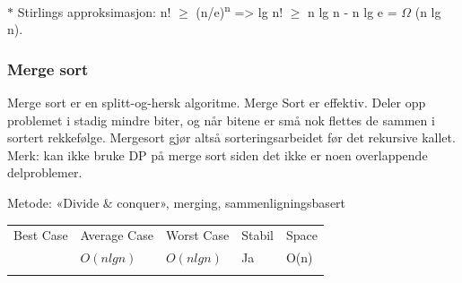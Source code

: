 \documentclass[12pt]{report}
\begin{document}
$\ast$ Stirlings approksimasjon: n! $ \geq $  (n/e)\textsuperscript{n} => lg n! $ \geq $  n lg n - n lg e = $ \Omega $ (n lg n).\par


\vspace{\baselineskip}

\vspace{\baselineskip}

\vspace{\baselineskip}

\vspace{\baselineskip}
\setlength{\parskip}{6.0pt}

\vspace{\baselineskip}\subsubsection*{Merge sort}
\setlength{\parskip}{10.56pt}
Merge sort er en splitt-og-hersk algoritme. Merge Sort er effektiv. Deler opp problemet i stadig mindre biter, og når bitene er små nok flettes de sammen i sortert rekkefølge. Mergesort gjør altså sorteringsarbeidet før det rekursive kallet. Merk: kan ikke bruke DP på merge sort siden det ikke er noen overlappende delproblemer.\par

Metode: «Divide $\&$  conquer», merging, sammenligningsbasert\par





\begin{table}[H]
 			\centering
\begin{tabular}{p{1.2in}p{1.68in}p{1.42in}p{0.73in}p{0.63in}}
\hline
\multicolumn{1}{p{1.2in}}{{\fontsize{13pt}{15.6pt}\selectfont Best Case}} & 
\multicolumn{1}{p{1.68in}}{{\fontsize{13pt}{15.6pt}\selectfont Average Case}} & 
\multicolumn{1}{p{1.42in}}{{\fontsize{13pt}{15.6pt}\selectfont Worst Case}} & 
\multicolumn{1}{p{0.73in}}{{\fontsize{13pt}{15.6pt}\selectfont Stabil}} & 
\multicolumn{1}{p{0.63in}}{{\fontsize{13pt}{15.6pt}\selectfont Space}} \\
\hhline{-----}
\multicolumn{1}{p{1.2in}}{ \( O \left( n lgn \right)  \) } & 
\multicolumn{1}{p{1.68in}}{ \( O \left( n lgn \right)  \) } & 
\multicolumn{1}{p{1.42in}}{ \( O \left( n lgn \right)  \) } & 
\multicolumn{1}{p{0.73in}}{{\fontsize{13pt}{15.6pt}\selectfont Ja}} & 
\multicolumn{1}{p{0.63in}}{{\fontsize{14pt}{16.8pt}\selectfont O(n)}} \\
\hhline{-----}

\end{tabular}
 \end{table}
\end{document}
